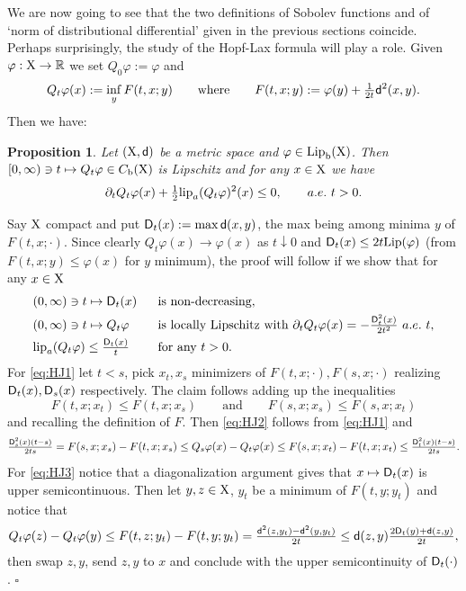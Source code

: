 \documentclass[11pt]{article}
\numberwithin{equation}{section}
\newtheorem{proposition}[theorem]{Proposition}
\newenvironment{idea}{\removelastskip\par\medskip   %
\noindent{\em Idea of the proof} \rm}{\penalty-20\null\hfill$\square$\par\medbreak}
\newcommand{\R}{\mathbb{R}}
\newcommand{\X}{{\rm X}}
\newcommand{\sfd}{{\sf d}}
\newcommand{\Lip}{{\rm Lip}}
\newcommand{\lipa}{{\rm lip}_a}
\renewcommand{\b}{{\rm b}}
\begin{document}
We are now going to see that the two definitions of Sobolev functions and of `norm of distributional differential' given in the previous sections coincide. Perhaps surprisingly, the study of the Hopf-Lax formula will play a role. Given $\varphi:\X\to\R$ we set $Q_0\varphi:=\varphi$ and
\begin{equation}
\label{eq:defHL}
Q_t\varphi(x):=\inf_yF(t,x;y)\qquad\text{where}\qquad  F(t,x;y):=\varphi(y)+\tfrac1{2t}\sfd^2(x,y).
\end{equation}
Then we have:
\begin{proposition}\label{prop:HL}
Let $(\X,\sfd)$ be a metric space and $\varphi\in\Lip_\b(\X)$. Then $[0,\infty)\ni t\mapsto Q_t\varphi\in C_\b(\X)$ is Lipschitz and for any $x\in\X$ we have
\begin{equation}
\label{eq:HJ}
\partial_tQ_t\varphi(x)+\tfrac12\lipa(Q_t\varphi)^2(x)\leq 0,\qquad a.e.\ t>0.
\end{equation}
\end{proposition}
\begin{idea} Say $\X$ compact and put ${\sf D}_t(x):=\max\sfd(x,y)$, the max being among minima $y$ of $F(t,x;\cdot)$. Since clearly $Q_t\varphi(x)\to\varphi(x)$ as $t\downarrow0$ and ${\sf D}_t(x)\leq 2t\Lip(\varphi)$ (from $F(t,x;y)\leq\varphi(x)$ for $y$ minimum), the proof will follow if we show that for any $x\in\X$
\begin{subequations}
\begin{align}\label{eq:HJ1}
&(0,\infty)\ni t\mapsto {\sf D}_t(x)&&\ \text{ is non-decreasing},\\
\label{eq:HJ2}
&(0,\infty)\ni t\mapsto Q_t\varphi&&\ \text{ is locally Lipschitz with }\partial_tQ_t\varphi(x)=-\tfrac{{\sf D}^2_t(x)}{2t^2}\ a.e.\ t,\\
\label{eq:HJ3}
&\lipa(Q_t\varphi)\leq \tfrac{{\sf D}_t(x)}t&&\  \text{ for any }t>0.
\end{align}
\end{subequations}
For \eqref{eq:HJ1} let $t<s$, pick $x_t,x_s$ minimizers of $F(t,x;\cdot), F(s,x;\cdot)$ realizing ${\sf D}_t(x),{\sf D}_s(x)$ respectively. The claim follows adding up the inequalities
\[
F(t,x;x_t)\leq F(t,x;x_s)\qquad\text{and}\qquad F(s,x;x_s)\leq F(s,x;x_t)
\]
and recalling the definition of $F$. Then \eqref{eq:HJ2} follows from \eqref{eq:HJ1} and
\[
\tfrac{{\sf D}_s^2(x)(t-s)}{2ts}=F(s,x;x_s)-F(t,x;x_s)\leq Q_s\varphi(x)- Q_t\varphi(x)\leq F(s,x;x_t)-F(t,x;x_t)\leq \tfrac{{\sf D}_t^2(x)(t-s)}{2ts}.
\]
For \eqref{eq:HJ3} notice that a diagonalization argument gives that $x\mapsto {\sf D}_t(x)$ is upper semicontinuous. Then let $y,z\in\X$, $y_t$ be a minimum of $F(t,y;y_t)$ and notice that
\[
\begin{split}
Q_t\varphi(z)-Q_t\varphi(y)\leq F(t,z;y_t)-F(t,y;y_t)=\tfrac{\sfd^2(z,y_t)-\sfd^2(y,y_t)}{2t}\leq\sfd(z,y)\tfrac{2{\sf D}_t(y)+\sfd(z,y)}{2t},
\end{split}
\]
then swap $z,y$, send $z,y$ to $x$ and conclude with the upper semicontinuity of ${\sf D}_t(\cdot)$.
\end{idea}
\end{document}
